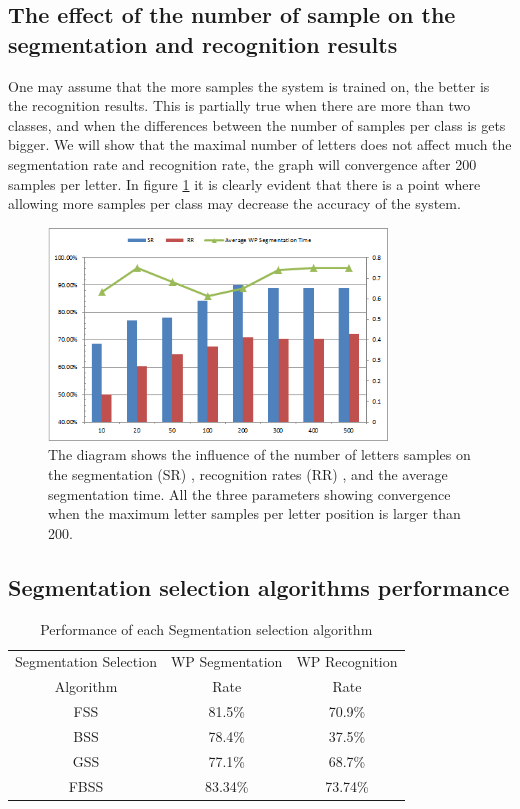 \documentclass[journal,compsoc]{IEEEtran}
\begin{document}
\subsection{The effect of the number of sample on the segmentation and recognition results}
One may assume that the more samples the system is trained on, the better is the recognition results. This is partially true when there are more than two classes, and when the differences between the number of samples per class is gets bigger.
We will show that the maximal number of letters does not affect much the segmentation rate and recognition rate, the graph will convergence after 200 samples per letter. In figure \ref{fig:num_letter_impact} it is clearly evident that there is a point where allowing more samples per class may decrease the accuracy of the system.

\begin{figure}[h]
\centering
\includegraphics[width=9cm]{./figures/num_letter_impact}
\caption{The diagram shows the influence of the number of letters samples on the segmentation (SR) , recognition rates (RR) , and the average segmentation time. All the three parameters showing convergence when the maximum letter samples per letter position is larger than 200. }
\label{fig:num_letter_impact}
\end{figure}


\subsection{Segmentation selection algorithms performance}

\begin{table}[h]
\caption{Performance of each Segmentation selection algorithm}
\begin{tabular}{ | c | c | c | }
\hline
Segmentation Selection & WP Segmentation & WP Recognition \\
Algorithm & Rate & Rate \\
\hline                 
  FSS & 81.5\% & 70.9\% \\ 
  \hline
  BSS & 78.4\% &  37.5\% \\ 
 \hline
 GSS & 77.1\% & 68.7\% \\ 
 \hline
 FBSS & 83.34\% & 73.74\% \\
\hline
\end{tabular}
\centering
\label{table:ss_algorithms_results} 
\end{table}
\end{document}
